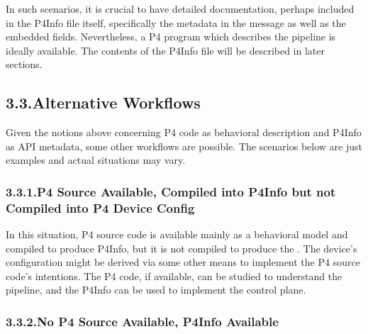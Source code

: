\documentclass[11pt]{article}
\begin{document}
{%
In such scenarios, it is crucial to have detailed documentation, perhaps
included in the P4Info file itself, specifically the metadata in the 
message as well as the embedded  fields. Nevertheless, a P4 program which
describes the pipeline is ideally available. The contents of the P4Info file
will be described in later sections.%

\subsection{3.3.\hspace*{0.5em}Alternative Workflows}\label{sec-alternative-workflows}%

\noindent{}Given the notions above concerning P4 code as behavioral description and P4Info
as API metadata, some other workflows are possible. The scenarios below are just
examples and actual situations may vary.%

\subsubsection{3.3.1.\hspace*{0.5em}P4 Source Available, Compiled into P4Info but not Compiled into P4 Device Config}\label{sec-p4-source-available-compiled-into-p4info-but-not-compiled-into-p4-device-config}%

\noindent{}In this situation, P4 source code is available mainly as a behavioral model and
compiled to produce P4Info, but it is not compiled to produce the
. The device's configuration might be derived via some other
means to implement the P4 source code's intentions. The P4 code, if available,
can be studied to understand the pipeline, and the P4Info can be used to
implement the control plane.%

\subsubsection{3.3.2.\hspace*{0.5em}No P4 Source Available, P4Info Available}\label{sec-no-p4-source-available-p4info-available}%

}
\end{document}
